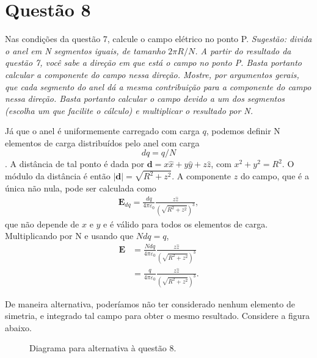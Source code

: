 \documentclass[11pt]{article}
\begin{document}
\section{Questão 8}
\label{sec:org2faf39e}
Nas condições da questão 7, calcule o campo elétrico no ponto
P. \emph{Sugestão: divida o anel em N segmentos iguais, de tamanho}
\emph{\(2\pi R/N\). A partir do resultado da questão 7, você sabe a direção em}
\emph{que está o campo no ponto P. Basta portanto calcular a componente do}
\emph{campo nessa direção. Mostre, por argumentos gerais, que cada segmento do}
\emph{anel dá a mesma contribuição para a componente do campo nessa}
\emph{direção. Basta portanto calcular o campo devido a um dos segmentos}
\emph{(escolha um que facilite o cálculo) e multiplicar o resultado por N.}

Já que o anel é uniformemente carregado com carga \(q\), podemos definir N
elementos de carga distribuídos pelo anel com carga $$ dq = q/N$$. A
distância de tal ponto é dada por \(\mathbf d = x\hat x+y\hat y+z\hat z\),
com \(x^2+y^2 = R^2\). O módulo da distância é então \(|\mathbf
d|=\sqrt{R^2+z^2}\). A componente \(\hat z\) do campo, que é a única não
nula, pode ser calculada como
\begin{align*}
  \mathbf E_{dq} = \frac{dq}{4\pi\varepsilon_0}\frac{z\hat z}{(\sqrt{R^2+z^2})^3},
\end{align*}
que não depende de \(x\) e \(y\) e é válido para todos os elementos de
carga. Multiplicando por N e usando que \(Ndq = q\),
\begin{align*}
  \mathbf E &= \frac{Ndq}{4\pi\varepsilon_0}\frac{z\hat z}{(\sqrt{R^2+z^2})^3}\\
            &= \frac{q}{4\pi\varepsilon_0}\frac{z\hat z}{(\sqrt{R^2+z^2})^3}.
\end{align*}

De maneira alternativa, poderíamos não ter considerado nenhum elemento
de simetria, e integrado tal campo para obter o mesmo
resultado. Considere a figura abaixo.
\begin{figure}[h!]
  \centering
  \caption{Diagrama para alternativa à questão 8.}
  \label{fig:ex-8}
\end{figure}
\end{document}
